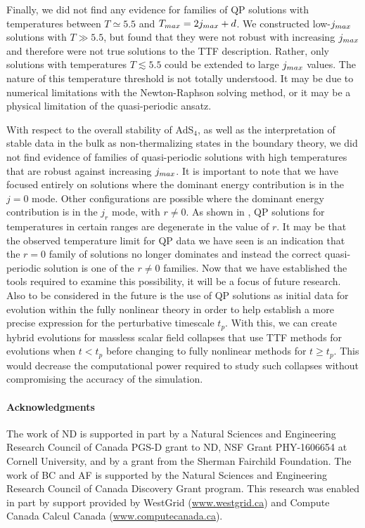 \documentclass[../PhD.tex]{subfiles}
\begin{document}
Finally, we did not find any evidence for families of QP solutions with temperatures between $T \simeq 5.5$ and $T_{max} = 2j_{max} + d$. We constructed low-$j_{max}$ solutions with $T \gg 5.5$, but found that they were not robust with increasing $j_{max}$ and therefore were not true solutions to the TTF description. Rather, only solutions with temperatures $T \lesssim 5.5$ could be extended to large $j_{max}$ values. The nature of this temperature threshold is not totally understood. It may be due to numerical limitations with the Newton-Raphson solving method, or it may be a physical limitation of the quasi-periodic ansatz.

With respect to the overall stability of AdS$_4$, as well as the interpretation of stable data in the bulk as non-thermalizing states in the boundary theory, we did not find evidence of families of quasi-periodic solutions with high temperatures that are robust against increasing $j_{max}$. It is important to note that we have focused entirely on solutions where the dominant energy contribution is in the $j = 0$ mode. Other configurations are possible where the dominant energy contribution is in the $j_r$ mode, with $r \neq 0$. As shown in \cite{1507.08261}, QP solutions for temperatures in certain ranges are degenerate in the value of $r$. It may be that the observed temperature limit for QP data we have seen is an indication that the $r=0$ family of solutions no longer dominates and instead the correct quasi-periodic solution is one of the $r \neq 0$ families. Now that we have established the tools required to examine this possibility, it will be a focus of future research. Also to be considered in the future is the use of QP solutions as initial data for evolution within the fully nonlinear theory in order to help establish a more precise expression for the perturbative timescale $t_p$. With this, we can create hybrid evolutions for massless scalar field collapses that use TTF methods for evolutions when $t < t_p$ before changing to fully nonlinear methods for $t \geq t_p$. This would decrease the computational power required to study such collapses without compromising the accuracy of the simulation.


\paragraph*{Acknowledgments} The work of ND is supported in part by a Natural Sciences and Engineering
Research Council of Canada PGS-D grant to ND, NSF Grant PHY-1606654 at Cornell University, and by a grant from the Sherman Fairchild Foundation. The work of BC and AF is supported by the Natural Sciences and Engineering Research Council of Canada Discovery Grant program. This research was enabled in part by support provided by WestGrid (\href{www.westgrid.ca}{www.westgrid.ca}) and Compute Canada Calcul Canada (\href{www.computecanada.ca}{www.computecanada.ca}).
\end{document}
